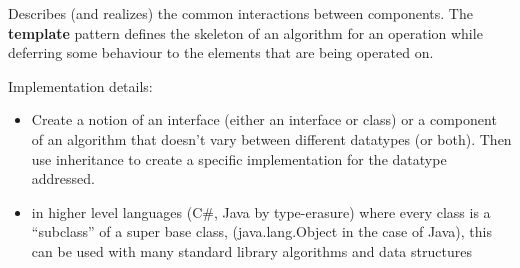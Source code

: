 \begin{summary}
    Describes (and realizes) the common interactions between components. The
    {\bf template} pattern defines the skeleton of an algorithm for an
    operation while deferring some behaviour to the elements that are being
    operated on.
\end{summary}

Implementation details: \begin{itemize}
    \item Create a notion of an interface (either an interface or class) or
        a component of an algorithm that doesn’t vary between different
        datatypes (or both). Then use inheritance to create a specific
        implementation for the datatype addressed.
    \item in higher level languages (C\#, Java by type-erasure) where
        every class is a ``subclass'' of a super base class, (java.lang.Object
        in the case of Java), this can be used with many standard library
        algorithms and data structures
\end{itemize}

